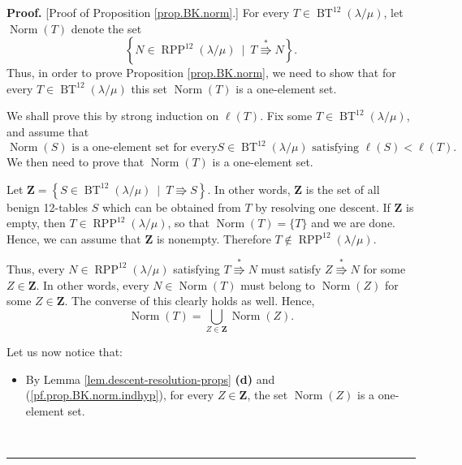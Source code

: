 \documentclass[numbers=enddot,12pt,final,onecolumn,notitlepage]{scrartcl}%
\theoremstyle{definition}
\newenvironment{proof}[1][Proof]{\noindent\textbf{#1.} }{\ \rule{0.5em}{0.5em}}
\def\OneTwoRPP{{\operatorname{RPP}^{12}\left(  \lambda/\mu\right)}}
\def\BenignTables{{\operatorname{BT}^{12}\left(  \lambda/\mu\right)}}
\begin{document}
\begin{proof}
[Proof of Proposition \ref{prop.BK.norm}.] For every $T\in\BenignTables$, let
$\operatorname*{Norm}\left(  T\right)  $ denote the set%
\[
\left\{  N\in\OneTwoRPP\ \mid\ T\overset{\ast}{\Rrightarrow}N\right\}  .
\]
Thus, in order to prove Proposition \ref{prop.BK.norm}, we need to show that for every $T\in\BenignTables$ this set $\operatorname*{Norm}%
\left(  T\right)  $ is a one-element set.

We shall prove this by strong induction on $\ell\left(  T\right)  $. Fix
some $T\in\BenignTables$, and assume that
\begin{equation}
\operatorname*{Norm}\left(  S\right)  \text{ is a one-element set for every
}S\in\BenignTables\text{ satisfying }\ell\left(  S\right)  <\ell\left(  T\right)
\text{.}\label{pf.prop.BK.norm.indhyp}%
\end{equation}
We then need to prove that $\operatorname*{Norm}\left(  T\right)  $ is a
one-element set.

Let $\mathbf{Z} = \left\{  S\in\BenignTables\ \mid\ T\Rrightarrow
S\right\}  $. In other words, $\mathbf{Z}$ is the set of all benign 12-tables
$S$ which can be obtained from $T$ by resolving one descent. If
$\mathbf{Z}$ is empty, then $T \in \OneTwoRPP$, so that
$\operatorname*{Norm}\left(  T\right) = \{T\}$ and we are done. Hence, we can
assume that $\mathbf{Z}$ is nonempty. Therefore $T \notin \OneTwoRPP$.

Thus, every $N \in \OneTwoRPP$ satisfying $T \overset{\ast}{\Rrightarrow} N$
must satisfy $Z \overset{\ast}{\Rrightarrow} N$ for some $Z \in \mathbf{Z}$.
In other words, every $N \in \operatorname{Norm}\left(T\right)$ must belong
to $\operatorname{Norm}\left(Z\right)$ for some $Z \in \mathbf{Z}$. The
converse of this clearly holds as well. Hence, 
\begin{equation}
\operatorname*{Norm}\left(  T\right)  =\bigcup_{Z\in\mathbf{Z}%
}\operatorname*{Norm}\left(  Z\right)  .
\label{pf.prop.BK.norm.union}
\end{equation}

Let us now notice that:

\begin{itemize}
\item By Lemma \ref{lem.descent-resolution-props} \textbf{(d)} and
(\ref{pf.prop.BK.norm.indhyp}), for every $Z\in\mathbf{Z}$, the set
$\operatorname*{Norm}\left( Z\right)  $ is a one-element set.


\end{itemize}
\end{proof}
\end{document}
